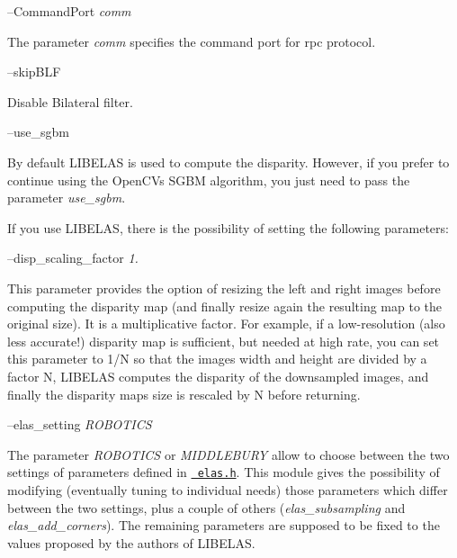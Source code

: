 --Command\+Port {\itshape comm} 
\begin{DoxyItemize}
\item The parameter {\itshape comm} specifies the command port for rpc protocol.
\end{DoxyItemize}

--skip\+B\+LF
\begin{DoxyItemize}
\item Disable Bilateral filter.
\end{DoxyItemize}

--use\+\_\+sgbm
\begin{DoxyItemize}
\item By default L\+I\+B\+E\+L\+AS is used to compute the disparity. However, if you prefer to continue using the Open\+CV\textquotesingle{}s S\+G\+BM algorithm, you just need to pass the parameter {\itshape use\+\_\+sgbm}.
\end{DoxyItemize}

If you use L\+I\+B\+E\+L\+AS, there is the possibility of setting the following parameters\+:

--disp\+\_\+scaling\+\_\+factor {\itshape 1.} 
\begin{DoxyItemize}
\item This parameter provides the option of resizing the left and right images before computing the disparity map (and finally resize again the resulting map to the original size). It is a multiplicative factor. For example, if a low-\/resolution (also less accurate!) disparity map is sufficient, but needed at high rate, you can set this parameter to 1/N so that the images width and height are divided by a factor N, L\+I\+B\+E\+L\+AS computes the disparity of the downsampled images, and finally the disparity map\textquotesingle{}s size is rescaled by N before returning.
\end{DoxyItemize}

--elas\+\_\+setting {\itshape R\+O\+B\+O\+T\+I\+CS} 
\begin{DoxyItemize}
\item The parameter {\itshape R\+O\+B\+O\+T\+I\+CS} or {\itshape M\+I\+D\+D\+L\+E\+B\+U\+RY} allow to choose between the two settings of parameters defined in \href{https://github.com/robotology/stereo-vision/tree/master/lib/elas/include/elas.h}{\texttt{ elas.\+h}}. This module gives the possibility of modifying (eventually tuning to individual needs) those parameters which differ between the two settings, plus a couple of others ({\itshape elas\+\_\+subsampling} and {\itshape elas\+\_\+add\+\_\+corners}). The remaining parameters are supposed to be fixed to the values proposed by the authors of L\+I\+B\+E\+L\+AS.
\end{DoxyItemize}


